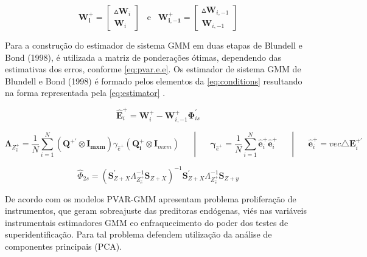 \documentclass[
  12pt,
  12pt,
  openright,
  oneside,
  a4paper,
  chapter=TITLE,
  section=TITLE,
  subsection=TITLE,
  subsubsection=TITLE,
  english,
  portugues,
  sumario=tradicional]{abntex2}
\begin{document}
\begin{equation}\label{eq:pvar.gdata}
\mathbf{W^{+}_{i}} = \left[\begin{array}{c}
\vartriangle\mathbf{W}_{i}  \\
\mathbf{W}_{i} 
\end{array}\right]\hspace{10pt}\text{e}\hspace{10pt}\mathbf{W^{+}_{i, -1}} = \left[\begin{array}{c}
\vartriangle\mathbf{W}_{i,-1}  \\
\mathbf{W}_{i,-1} 
\end{array}\right]
\end{equation}

Para a construção do estimador de sistema GMM em duas etapas de Blundell e Bond (1998), é utilizada a matriz de ponderações ótimas, dependendo das estimativas dos erros, conforme \autoref{eq:pvar.e.e}. Os estimador de sistema GMM de Blundell e Bond (1998) é formado pelos elementos da \autoref{eq:conditions} resultando na forma representada pela \autoref{eq:estimator} \cite{sigmund:2008}.

\begin{equation}\label{eq:pvar.e.e}
\mathbf{\hat{E}}_{i}^{+} = \mathbf{W}_{i}^{+} - \mathbf{W}_{i,-1}^{+}\mathbf{\Phi}_{is}^{'} 
\end{equation}

\begin{equation}\label{eq:conditions}\mathbf{\Lambda}_{Z^{+}_{\hat{e}}} = \frac{1}{N}\sum_{i = 1}^{N}(\mathbf{Q^{+'}}\otimes\mathbf{I_{m x m}})\gamma_{\hat{e}^{+}}(\mathbf{Q_{i}^{+}}\otimes\mathbf{I}_{mxm})\hspace{20pt} |  \hspace{20pt}\mathbf{\gamma}_{\hat{e}^{+}} = \frac{1}{N}\sum_{i=1}^{N} \mathbf{\hat{e}}_{i}^{+} \mathbf{\hat{e}}_{i}^{+} \hspace{20pt} |  \hspace{20pt}\mathbf{\hat{e}}_{i}^{+} = vec{\triangle\mathbf{E}_{i}^{+'}} 
\end{equation}

\begin{equation}\label{eq:estimator}
\hat{\Phi}_{2s} =  (\mathbf{S}^{'}_{Z+X} \Lambda^{-1}_{Z^{+}_{\hat{e}}}\mathbf{S}_{Z+X})^{-1} \mathbf{S}^{'}_{Z+X} \Lambda^{-1}_{Z^{+}_{\hat{e}}}\mathbf{S}_{Z+y}
\end{equation}

De acordo com \textcite{bontempi:2015} os modelos PVAR-GMM apresentam problema proliferação de instrumentos, que geram sobreajuste das preditoras endógenas, viés nas variáveis instrumentais estimadores GMM eo enfraquecimento do poder dos testes de superidentificação. Para tal problema \textcite{bontempi:2015} defendem utilização da análise de componentes principais (PCA).
\end{document}
